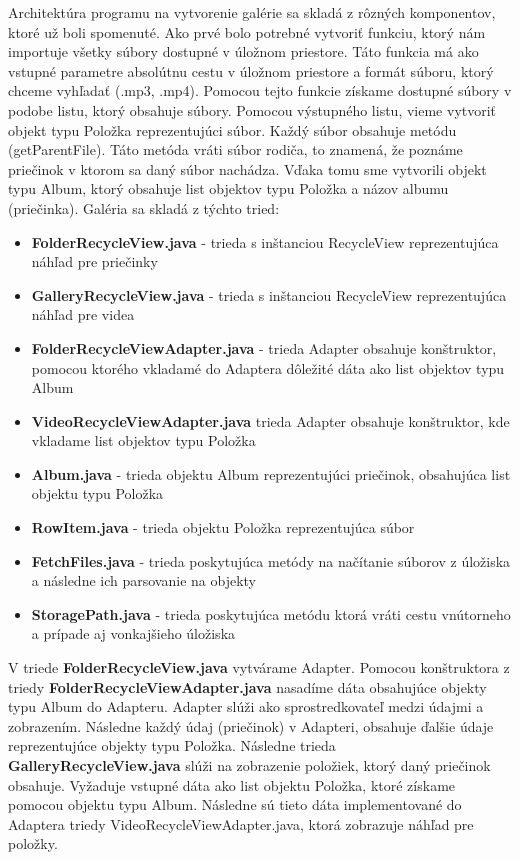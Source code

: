 \documentclass[12pt, oneside]{book}
\begin{document}
\hspace{15pt} Architektúra programu na vytvorenie galérie sa skladá z rôzných komponentov, ktoré už boli spomenuté. Ako prvé bolo potrebné vytvoriť funkciu, ktorý nám importuje všetky súbory dostupné v úložnom priestore. Táto funkcia má ako vstupné  parametre absolútnu cestu v úložnom priestore a formát súboru, ktorý chceme vyhľadať (.mp3, .mp4). Pomocou tejto funkcie získame dostupné súbory v podobe listu, ktorý obsahuje súbory. Pomocou výstupného listu, vieme vytvoriť objekt typu Položka reprezentujúci súbor. Každý súbor obsahuje metódu (getParentFile). Táto metóda vráti súbor rodiča, to znamená, že poznáme priečinok v ktorom sa daný súbor nachádza. Vďaka tomu sme vytvorili objekt typu Album, ktorý obsahuje list objektov typu Položka a názov albumu (priečinka). 
Galéria sa skladá z týchto tried:
\begin{itemize}
    \item \textbf{FolderRecycleView.java} - trieda s inštanciou RecycleView reprezentujúca náhľad pre priečinky
    \item \textbf{GalleryRecycleView.java} - trieda s inštanciou RecycleView reprezentujúca náhľad pre videa
    \item \textbf{FolderRecycleViewAdapter.java} - trieda Adapter obsahuje konštruktor, pomocou ktorého vkladamé do Adaptera dôležité dáta ako list objektov typu Album
    \item \textbf{VideoRecycleViewAdapter.java} trieda Adapter obsahuje konštruktor, kde vkladame list objektov typu Položka
    \item \textbf{Album.java} - trieda objektu Album reprezentujúci priečinok, obsahujúca list objektu typu Položka
    \item \textbf{RowItem.java} - trieda objektu Položka reprezentujúca súbor
    \item \textbf{FetchFiles.java} - trieda poskytujúca metódy na načítanie súborov z úložiska a následne ich parsovanie na objekty
    \item \textbf{StoragePath.java} - trieda poskytujúca metódu ktorá vráti cestu vnútorneho a prípade aj vonkajšieho úložiska
\end{itemize}

V triede \textbf{FolderRecycleView.java} vytvárame Adapter. Pomocou konštruktora z triedy \textbf{FolderRecycleViewAdapter.java} nasadíme dáta obsahujúce objekty typu Album do Adapteru. Adapter slúži ako sprostredkovateľ medzi údajmi a zobrazením. Následne každý údaj (priečinok) v Adapteri, obsahuje ďalšie údaje reprezentujúce objekty typu Položka. Následne trieda \textbf{GalleryRecycleView.java} slúži na zobrazenie položiek, ktorý daný priečinok obsahuje. Vyžaduje vstupné dáta ako list objektu Položka, ktoré získame pomocou objektu typu Album. Následne sú tieto dáta implementované do Adaptera triedy VideoRecycleViewAdapter.java, ktorá zobrazuje náhľad pre položky.
\end{document}
